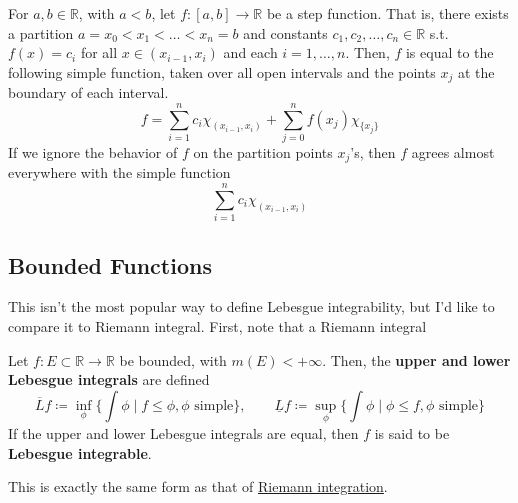   \begin{example}
    For $a, b \in \mathbb{R}$, with $a < b$, let $f: [a, b] \longrightarrow \mathbb{R}$ be a step function. That is, there exists a partition $a = x_0 < x_1 < \ldots < x_n = b$ and constants $c_1, c_2, \ldots, c_n \in \mathbb{R}$ s.t. $f(x) = c_i$ for all $x \in (x_{i-1}, x_i)$ and each $i = 1, \ldots, n$. Then, $f$ is equal to the following simple function, taken over all open intervals and the points $x_j$ at the boundary of each interval. 
    \begin{equation}
      f = \sum_{i=1}^n c_i \chi_{(x_{i-1}, x_i)} + \sum_{j=0}^n f(x_j) \chi_{\{x_j\}}
    \end{equation}
    If we ignore the behavior of $f$ on the partition points $x_j$'s, then $f$ agrees almost everywhere with the simple function 
    \begin{equation}
      \sum_{i=1}^n c_i \chi_{(x_{i-1}, x_i)}
    \end{equation}
  \end{example} 

\subsection{Bounded Functions} 

  This isn't the most popular way to define Lebesgue integrability, but I'd like to compare it to Riemann integral. First, note that a Riemann integral 

  \begin{definition}
    Let $f: E \subset \mathbb{R} \to \mathbb{R}$ be bounded, with $m(E) < +\infty$. Then, the \textbf{upper and lower Lebesgue integrals} are defined 
    \begin{equation}
      \overline{L} f \coloneqq \inf_{\phi} \bigg\{ \int \phi \; \bigg| \; f \leq \phi, \phi \text{ simple} \bigg\}, \qquad \underline{L} f \coloneqq \sup_{\phi} \bigg\{ \int \phi \; \bigg| \; \phi \leq f, \phi \text{ simple} \bigg\}
    \end{equation}
    If the upper and lower Lebesgue integrals are equal, then $f$ is said to be \textbf{Lebesgue integrable}.
  \end{definition}

  This is exactly the same form as that of \hyperref[real-def:riemann-integral]{Riemann integration}. 

  \begin{definition}[]
    
  \end{definition}

